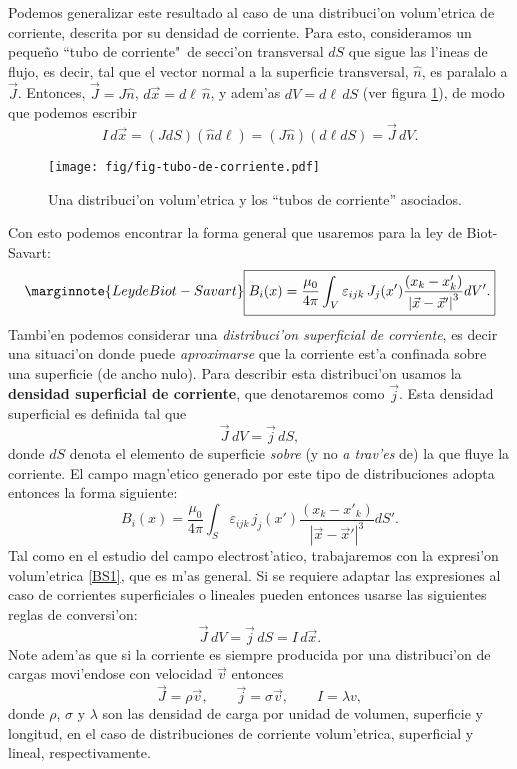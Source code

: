 Podemos generalizar este resultado al caso de una distribuci'on volum'etrica de corriente, descrita por su densidad de corriente. Para esto, consideramos un peque\~no ``tubo de corriente"\, de secci'on transversal $dS$ que sigue las l'ineas de flujo, es decir, tal que el vector normal a la superficie transversal, $\hat{n}$, es paralalo a $\vec{J}$. Entonces, $\vec{J}=J\hat{n}$, $d\vec{x}=d\ell\,\hat{n}$, y adem'as $dV=d\ell\, dS$ (ver figura \ref{fig:tc}), de modo que podemos escribir
\begin{equation}
I\, d\vec{x}=(J dS)(\hat{n}d\ell)=(J\hat{n})(d\ell dS)=\vec{J}\,dV.
\end{equation}
\begin{figure}[!h]
\centerline{\texttt{[image: fig/fig-tubo-de-corriente.pdf]}}
\caption{Una distribuci'on volum'etrica y los ``tubos de corriente'' asociados.}
\label{fig:tc}
\end{figure}
Con esto podemos encontrar la forma general que usaremos para la ley de Biot-Savart:
\begin{equation}\marginnote{Ley de Biot-Savart}
 \boxed{B_i(x)=\frac{\mu_0}{4\pi}\int_V\varepsilon_{ijk}\,J_j(x')
\frac{\left(x_k-x'_k\right)}{\left\vert\vec{x}-\vec{x}'\right\vert^3}dV'. }
\label{BS2}
\end{equation}
Tambi'en podemos considerar una \textit{distribuci'on superficial de corriente}, es decir una situaci'on donde puede \textit{aproximarse} que la corriente est'a confinada sobre una superficie (de ancho nulo). Para describir esta distribuci'on usamos la \textbf{densidad superficial de corriente}, que denotaremos como $\vec{j}$. Esta densidad superficial es definida tal que
\begin{equation}
\vec{J}\,dV=\vec{j}\,dS,
\end{equation}
donde $dS$ denota el elemento de superficie \textit{sobre} (y no \textit{a trav'es} de) la que fluye la corriente. El campo magn'etico generado por este tipo de distribuciones adopta entonces la forma siguiente:
\begin{equation}
 \boxed{B_i(x)=\frac{\mu_0}{4\pi}\int_S\varepsilon_{ijk}\,j_j(x')
\frac{\left(x_k-x'_k\right)}{\left\vert\vec{x}-\vec{x}'\right\vert^3}dS'. }
\label{BSsup}
\end{equation}
Tal como en el estudio del campo electrost'atico, trabajaremos con la expresi'on volum'etrica \eqref{BS1}, que es m'as general. Si se requiere adaptar las expresiones al caso de corrientes superficiales o lineales pueden entonces usarse las siguientes reglas de conversi'on:
\begin{equation}\label{IdxJdV}
\vec{J}\,dV=\vec{j}\,dS=I\,d\vec{x}.
\end{equation}
Note adem'as que si la corriente es siempre producida por una distribuci'on de cargas movi'endose con velocidad $\vec{v}$ entonces 
\begin{equation}
\vec{J}=\rho\vec{v}, \qquad \vec{j}=\sigma\vec{v}, \qquad I=\lambda v,
\end{equation}
donde $\rho$, $\sigma$ y $\lambda$ son las densidad de carga por unidad de volumen, superficie y longitud, en el caso de distribuciones de corriente volum'etrica, superficial y lineal, respectivamente.

